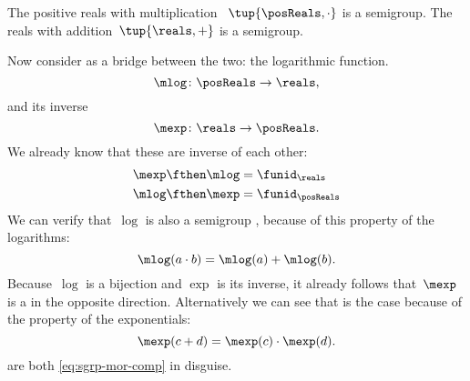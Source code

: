 \begin{example}
  The positive reals with multiplication ~$\tup{\posReals, \cdot}$ is a semigroup.
  The reals with addition~$\tup{\reals, +}$ is a semigroup.

  Now consider as a bridge between the two: the logarithmic function.
  \begin{equation*}
    \label{eq:log}
    \mlog \colon  \posReals \to \reals,
  \end{equation*}
  and its inverse
  \begin{equation*}
    \label{eq:exp}
    \mexp \colon  \reals \to \posReals.
  \end{equation*}
  We already know that these are inverse of each other:
  \begin{equation*}\label{eq:exp-log-are-inverses}
    \begin{aligned}
      \mexp \fthen \mlog &= \funid_{\reals} \\
      \mlog \fthen \mexp &= \funid_{\posReals}
    \end{aligned}
  \end{equation*}
  We can verify that~$\log$ is also a semigroup \whomo, because of this property of the logarithms:
  \begin{equation}
    \label{eq:log-property}
    \mlog(a \cdot b) = \mlog(a) + \mlog(b).
  \end{equation}
  Because~$\log$ is a bijection and $\exp$ is its inverse, it already follows that~$\mexp$ is
  a \whomo in the opposite direction.
  Alternatively we can see that is the case because of the property of the exponentials:
  \begin{equation}
    \label{eq:exp-property}
    \mexp(c + d) = \mexp(c) \cdot \mexp(d).
  \end{equation}
   are both \cref{eq:sgrp-mor-comp} in disguise.
\end{example}

